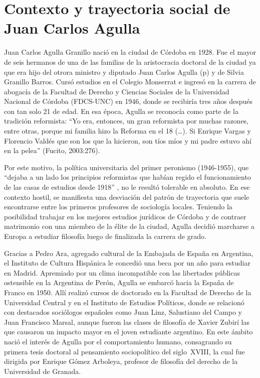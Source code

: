\section{Contexto y trayectoria social de Juan Carlos Agulla}

Juan Carlos Agulla Granillo nació en la ciudad de Córdoba en 1928. Fue el mayor de seis hermanos de una de las familias de la aristocracia doctoral de la ciudad ya que era hijo del otrora ministro y diputado Juan Carlos Agulla (p) y de Silvia Granillo Barros. Cursó estudios en el Colegio Monserrat e ingresó en la carrera de abogacía de la Facultad de Derecho y Ciencias Sociales de la Universidad Nacional de Córdoba (FDCS-UNC) en 1946, donde se recibiría tres años después con tan solo 21 de edad. En esa época, Agulla se reconocía como parte de la tradición reformista: \enquote{Yo era, entonces, un gran reformista por muchas razones, entre otras, porque mi familia hizo la Reforma en el 18 (\dots). Si Enrique Vargas y Florencio Valdés que son los que la hicieron, son tíos míos y mi padre estuvo ahí en la pelea} (Fucito, 2003:276).

Por este motivo, la política universitaria del primer peronismo (1946-1955), que \enquote{dejaba a un lado los principios reformistas que habían regido el funcionamiento de las casas de estudios desde 1918} \parencite[152]{1536-BUCHBINDER2010}, no le resultó tolerable en absoluto. En ese contexto hostil, se manifiesta una desviación del patrón de trayectoria que suele encontrarse entre los primeros profesores de sociología locales. Teniendo la posibilidad trabajar en los mejores estudios jurídicos de Córdoba y de contraer matrimonio con una miembro de la élite de la ciudad, Agulla decidió marcharse a Europa a estudiar filosofía luego de finalizada la carrera de grado.

Gracias a Pedro Ara, agregado cultural de la Embajada de España en Argentina, el Instituto de Cultura Hispánica le concedió una beca por un año para estudiar en Madrid. Apremiado por un clima incompatible con las libertades públicas ostensible en la Argentina de Perón, Agulla se embarcó hacia la España de Franco en 1950. Allí realizó cursos de doctorado en la Facultad de Derecho de la Universidad Central y en el Instituto de Estudios Políticos, donde se relacionó con destacados sociólogos españoles como Juan Linz, Salustiano del Campo y Juan Francisco Marsal, aunque fueron las clases de filosofía de Xavier Zubirí las que causaron un impacto mayor en el joven estudiante argentino. En este ámbito nació el interés de Agulla por el comportamiento humano, consagrando su primera tesis doctoral al pensamiento sociopolítico del siglo~XVIII, la cual fue dirigida por Enrique Gómez Arboleya, profesor de filosofía del derecho de la Universidad de Granada.

